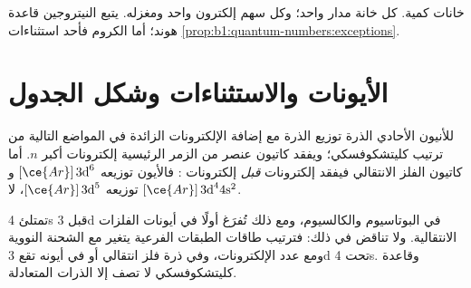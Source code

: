 \begin{omfigure}

{\small خانات كمية. كل خانة مدار واحد؛ وكل سهم إلكترون واحد
ومغزله. يتبع النيتروجين قاعدة هوند؛ أما الكروم فأحد
استثناءات \cref{prop:b1:quantum-numbers:exceptions}.}
\end{omfigure}

\section{الأيونات والاستثناءات وشكل الجدول}

\begin{proposition}\label{prop:b1:quantum-numbers:ions}
للأنيون الأحادي الذرة توزيع الذرة مع إضافة الإلكترونات الزائدة في
المواضع التالية من ترتيب كليتشكوفسكي؛ ويفقد كاتيون عنصر من الزمر
الرئيسية إلكترونات أكبر $n$. أما كاتيون الفلز الانتقالي فيفقد إلكترونات
 \emph{قبل} إلكترونات
: فالأيون  توزيعه $[\ce{Ar}]\,3\text{d}^6$
و توزيعه $[\ce{Ar}]\,3\text{d}^5$، لا $[\ce{Ar}]\,3\text{d}^4
4\text{s}^2$.
\end{proposition}
\admitted

\begin{remark}\label{rem:b1:quantum-numbers:order}
تمتلئ 4s قبل 3d في البوتاسيوم والكالسيوم، ومع ذلك تُفرَغ أولًا في
أيونات الفلزات الانتقالية. ولا تناقض في ذلك: فترتيب طاقات الطبقات الفرعية
يتغير مع الشحنة النووية ومع عدد الإلكترونات، وفي ذرة فلز انتقالي أو في
أيونه تقع  3d تحت 4s. وقاعدة كليتشكوفسكي لا تصف إلا الذرات المتعادلة.
\end{remark}


